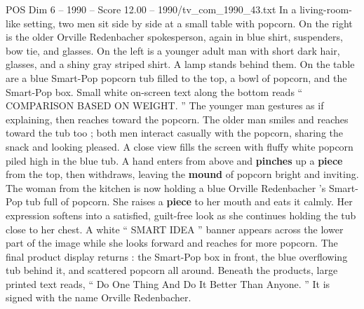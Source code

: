 \begin{textsample}{POS Dim 6 – 1990 – Score 12.00 – 1990/tv\_com\_1990\_43.txt}
In a living-room-like setting, two men sit side by side at a small table with popcorn.
On the right is the older Orville Redenbacher spokesperson, again in blue shirt, suspenders, bow tie, and glasses.
On the left is a younger adult man with short dark hair, glasses, and a shiny gray striped shirt.
A lamp stands behind them.
On the table are a blue Smart-Pop popcorn tub filled to the top, a bowl of popcorn, and the Smart-Pop box.
Small white on-screen text along the bottom reads “ COMPARISON BASED ON WEIGHT. ” The younger man gestures as if explaining, then reaches toward the popcorn.
The older man smiles and reaches toward the tub too ; both men interact casually with the popcorn, sharing the snack and looking pleased.
A close view fills the screen with fluffy white popcorn piled high in the blue tub.
A hand enters from above and \textbf{pinches} up a \textbf{piece} from the top, then withdraws, leaving the \textbf{mound} of popcorn bright and inviting.
The woman from the kitchen is now holding a blue Orville Redenbacher ’s Smart-Pop tub full of popcorn.
She raises a \textbf{piece} to her mouth and eats it calmly.
Her expression softens into a satisfied, guilt-free look as she continues holding the tub close to her chest.
A white “ SMART IDEA ” banner appears across the lower part of the image while she looks forward and reaches for more popcorn.
The final product display returns : the Smart-Pop box in front, the blue overflowing tub behind it, and scattered popcorn all around.
Beneath the products, large printed text reads, “ Do One Thing And Do It Better Than Anyone. ” It is signed with the name Orville Redenbacher.

\end{textsample}
